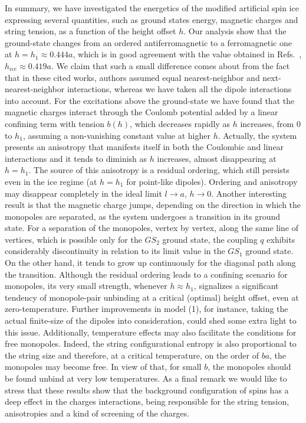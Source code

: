 \documentclass[aps,prb,twocolumn,floatfix,showpacs,amsmath,amssymb]{revtex4}
\begin{document}
In summary, we have investigated the energetics of the modified
artificial spin ice expressing several quantities, such as ground
states energy, magnetic charges and string tension, as a function
of the height offset $h$. Our analysis show that the ground-state
changes from an ordered antiferromagnetic to a ferromagnetic one
at $h=h_1\approx 0.444a$, which is in good agreement with the
value obtained in Refs.~,
$h_{ice}\approx 0.419a$. We claim that such a small difference
comes about from the fact that in these cited works, authors
assumed equal nearest-neighbor and next-nearest-neighbor
interactions, whereas we have taken all the dipole interactions
into account. For the excitations above the ground-state we have
found that the magnetic charges interact through the Coulomb
potential added by a linear confining term with tension $b(h)$,
which decreases rapidly as $h$ increases, from $0$ to $h_1$,
assuming a non-vanishing constant value at higher $h$.
Actually, the system presents an anisotropy that manifests
itself in both the Coulombic and linear interactions and it tends
to diminish as $h$ increases, almost disappearing at $h=h_{1}$.
The source of this anisotropy is a residual ordering, which still
persists even in the ice regime (at $h=h_{1}$ for point-like
dipoles). Ordering and anisotropy may disappear completely in the
ideal limit $l\rightarrow a$, $h\rightarrow 0$. Another
interesting result is that the magnetic charge jumps, depending on
the direction in which the monopoles are separated, as the system
undergoes a transition in its ground state. For a separation of
the monopoles, vertex by vertex, along the same line of vertices,
which is possible only for the $GS_{2}$ ground state, the coupling
$q$ exhibits considerably discontinuity in relation to its limit
value in the $GS_{1}$ ground state.
On the other hand, it tends to grow up continuously for the
diagonal path along the transition. Although the residual ordering
leads to a confining scenario for monopoles, its very small
strength, whenever $h\approx h_1$, signalizes a significant
tendency of monopole-pair unbinding at a critical (optimal) height
offset, even at zero-temperature. Further improvements in model
(1), for instance, taking the actual finite-size of the dipoles
into consideration, could shed some extra light to this issue.
Additionally, temperature effects may also facilitate the
conditions for free monopoles. Indeed, the string configurational
entropy is also proportional to the string size and therefore, at
a critical temperature\cite{Mol09}, on the order of $ba$, the
monopoles may become free. In view of that, for small $b$, the
monopoles should be found unbind at very low temperatures. 
As a final remark we would like to stress that these results
show that the background configuration of spins has a deep effect
in the charges interactions, being responsible for the string tension,
anisotropies and a kind of screening of the charges.
\end{document}

